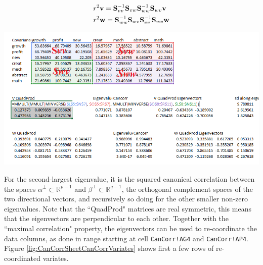 \documentclass[article]{jss}
\begin{document}
        \[\begin{gathered}
        r^2\textbf{v}  = \textbf{S}_{vv}^{ - 1}{\textbf{S}_{vw}}\textbf{S}_{ww}^{ - 1}{\textbf{S}_{wv}}\textbf{v}  \hfill \\
        r^2\textbf{w} = \textbf{S}_{ww}^{ - 1}{\textbf{S}_{wv}}\textbf{S}_{vv}^{ - 1}{\textbf{S}_{vw}}\textbf{w}  \hfill \\ 
        \end{gathered} \]
        \begin{center}
          \includegraphics[width=\linewidth, keepaspectratio=true]{CanCorrSheetExplain_png}
        \end{center}
        For the second-largest eigenvalue, it is the squared canonical correlation between the spaces $\alpha^\bot\subset\mathbb{R}^{p-1}$ and $\beta^\bot\subset\mathbb{R}^{q-1}$, the orthogonal complement spaces of the two directional vectors, and recursively so doing for the other smaller non-zero eigenvalues. Note that the ``QuadProd" matrices are real symmetric, this means that the eigenvectors are perpendicular to each other. Together with the ``maximal correlation" property, the eigenvectors can be used to re-coordinate the data columns, as done in range starting at cell \texttt{CanCorr!AG4} and \texttt{CanCorr!AP4}. Figure \ref{fig:CanCorrSheetCanCorrVariates} shows first a few rows of re-coordinated variates.
\end{document}
